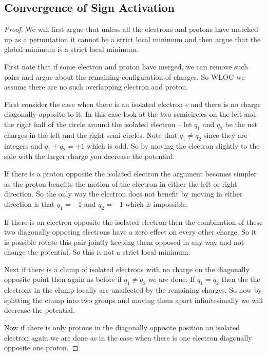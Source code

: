 
\subsection{Convergence of Sign Activation}

\signcon*

\begin{proof}
We will first argue that unless all the electrons and protons have matched up as a permutation it cannot be a strict local minimum and then argue that the global minimum is a strict local minimum.

First note that if some electron and proton have merged, we can remove such pairs and argue about the remaining configuration of charges. So WLOG we assume there are no such overlapping electron and proton.

First consider the case when there is an isolated electron $e$ and there is no charge diagonally opposite to it. In this case look at the two semicircles on the left and the right half of the circle around the isolated electron -- let $q_1$ and $q_2$ be the net charges in the left and the right semi-circles. Note that $q_1 \neq q_2$ since they are integers and $q_1 + q_2 = +1$ which is odd. So by moving the electron slightly to the side with the larger charge you decrease the potential.

If there is a proton opposite the isolated electron the argument becomes simpler as the proton benefits the motion of the electron in either the left or right direction. So  the only way the electron does not benefit by moving in either direction is that $q_1 = -1$ and $q_2 = -1$ which is impossible.

If there is an electron opposite the isolated electron then the combination of these two diagonally opposing electrons have a zero effect on every other charge. So it is possible rotate this pair jointly keeping them opposed in any way and not change the potential. So this is not a strict local minimum.

Next if there is a clump of isolated electrons with no charge on the diagonally opposite point then again as before if $q_1 \neq q_2$ we are done. If  $q_1 = q_2$ then the the electrons in the clump locally are unaffected by the remaining charges. So now by splitting the clump into two groups and moving them apart infinitesimally we will decrease the potential.

Now if there is only protons in the diagonally opposite position an isolated electron again we are done as in the case when there is one electron diagonally opposite one proton. 


\end{proof}
